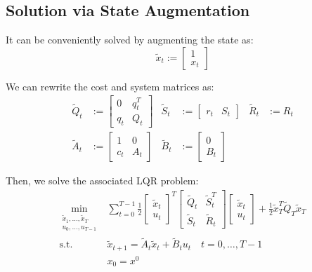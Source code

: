 \documentclass[openany]{book}
\theoremstyle{definition}
\theoremstyle{remark}
\begin{document}
\subsection{Solution via State Augmentation}
It can be conveniently solved by augmenting the state as:
\[
    \tilde{x}_t := \begin{bmatrix}
        1 \\ x_t
    \end{bmatrix}
\]

We can rewrite the cost and system matrices as:
\begin{align*}
    \tilde{Q}_t &:= \begin{bmatrix}
        0 & q_t^T \\ q_t & Q_t
    \end{bmatrix} & \tilde{S}_t &:= \begin{bmatrix}
        r_t & S_t
    \end{bmatrix} & \tilde{R}_t &:= R_t \\
    \tilde{A}_t &:= \begin{bmatrix}
        1 & 0 \\ c_t & A_t
    \end{bmatrix} & \tilde{B}_t &:= \begin{bmatrix}
        0 \\ B_t
    \end{bmatrix}
\end{align*}

Then, we solve the associated LQR problem:
\begin{align*}
    \min_{\substack{\tilde{x}_1,\dots,\tilde{x}_T\\u_0,\dots,u_{T-1}}} & \displaystyle\sum_{t=0}^{T-1}\frac{1}{2}\begin{bmatrix}
        \tilde{x}_t \\ u_t
    \end{bmatrix}^T \begin{bmatrix}
        \tilde{Q}_t & \tilde{S}_t^T \\ \tilde{S}_t & \tilde{R}_t
    \end{bmatrix} \begin{bmatrix}
        \tilde{x}_t \\ u_t
    \end{bmatrix} + \frac{1}{2}\tilde{x}_T^T\tilde{Q}_T\tilde{x}_T\\
    \text{s.t. } & \tilde{x}_{t+1} = \tilde{A}_t\tilde{x}_t + \tilde{B}_tu_t \quad t = 0,\dots,T-1\\
    & x_0 = x^0
\end{align*}
\end{document}
